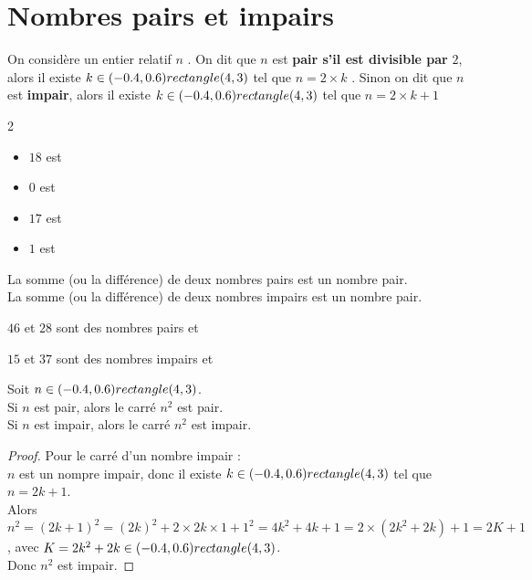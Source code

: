 \newpage

\section{Nombres pairs et impairs}
\begin{Définition}
On considère un entier relatif $n$ .
On dit que $n$ est {\bf{pair s'il est divisible par}} $2$, alors il existe $k\in (-0.4,0.6) rectangle (4,3)$ tel que $n=2\times k$ .
Sinon on dit que $n$ est {\bf{impair}}, alors il existe $k\in (-0.4,0.6) rectangle (4,3)$ tel que $n=2\times k +1$
\end{Définition}
\begin{Exemple}
\leavevmode\vspace{-\baselineskip}
\begin{multicols}{2}
\begin{itemize}[label=\textcolor{Couleur8}{$\bullet$}]
\item $18$ est \ligne

\item $0$ est \ligne

\item $17$ est \ligne

\item $1$ est \ligne

\end{itemize}
\end{multicols}
\end{Exemple}

\begin{Propriété}
La somme (ou la différence) de deux nombres pairs est un nombre pair.\\
La somme (ou la différence) de deux nombres impairs est un nombre pair.
\end{Propriété}

\begin{Exemple}
$46$ et $28$ sont des nombres pairs et \ligne

$15$ et $37$ sont des nombres impairs et \ligne

\end{Exemple}

\begin{Propriété}
Soit $n\in (-0.4,0.6) rectangle (4,3)$. \\
Si $n$ est pair, alors le carré $n^2$ est pair.\\
Si $n$ est impair, alors le carré $n^2$ est impair.
\end{Propriété}

\begin{proof}
Pour le carré d'un nombre impair :\\
$n$ est un nompre impair, donc il existe $k\in (-0.4,0.6) rectangle (4,3)$ tel que $n=2k+1$. \\Alors $n^2=(2k+1)^2=(2k)^2+2\times 2k\times 1 +1^2=4k^2+4k+1=2\times (2k^2+2k)+1=2K+1$, avec $K=2k^2+2k \in (-0.4,0.6) rectangle (4,3)$. \\Donc $n^2$ est impair.
\end{proof}

